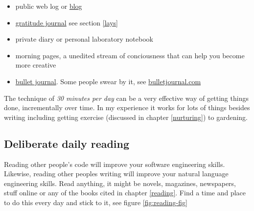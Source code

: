 \documentclass[
]{book}
\providecommand{\tightlist}{%
  \setlength{\itemsep}{0pt}\setlength{\parskip}{0pt}}
\begin{document}
\begin{itemize}
\tightlist
\item
  public web log or \href{https://en.wikipedia.org/wiki/Blog}{blog}
\item
  \href{https://en.wikipedia.org/wiki/Gratitude_journal}{gratitude journal} see section \ref{lays}
\item
  private diary or personal laboratory notebook
\item
  morning pages, a unedited stream of conciousness that can help you become more creative \citep{cameron, burkeman}
\item
  \href{https://en.wikipedia.org/wiki/Bullet_journal}{bullet journal}. Some people swear by it, see \href{https://bulletjournal.com/}{bulletjournal.com}
\end{itemize}

The technique of \emph{30 minutes per day} can be a very effective way of getting things done, incrementally over time. In my experience it works for lots of things besides writing including getting exercise (discussed in chapter \ref{nurturing}) to gardening. \citep{leendertz}

\hypertarget{dailyread}{%
\subsection{Deliberate daily reading}\label{dailyread}}

Reading other people's code will improve your software engineering skills. Likewise, reading other peoples writing will improve your natural language engineering skills. Read anything, it might be novels, magazines, newspapers, stuff online or any of the books cited in chapter \ref{reading}. Find a time and place to do this every day and stick to it, see figure \ref{fig:reading-fig}
\end{document}
